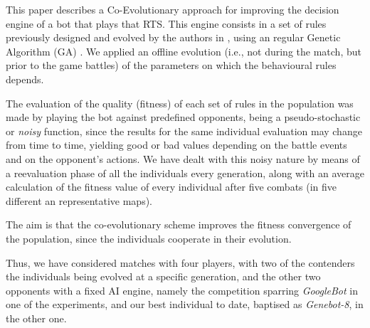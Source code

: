\documentclass{llncs}
\begin{document}
This paper describes a Co-Evolutionary \cite{Coevolution95} approach
for improving %
the decision engine of a bot that plays that RTS. This engine consists
in a set of rules previously designed and evolved by the authors in
\cite{Genebot_CEC11} %
, using an %
regular Genetic Algorithm (GA) \cite{GAs_Goldberg89}. We
applied an offline evolution (i.e., not during the match, but prior to
the game battles) of the parameters on which the behavioural rules
depends. 

The evaluation of the quality (fitness) of each set of rules in the
population was made by playing the bot against predefined opponents, being a pseudo-stochastic or \textit{noisy} function, since the results for the same individual evaluation may change from time to time, yielding good or bad values depending on the battle events and on the opponent's actions. We have dealt with this noisy nature \cite{genebot-evo12} %
by means of a reevaluation phase of all the individuals every generation, along with an average calculation of the fitness value of every individual after five combats (in five different an representative maps). %

The aim is that the co-evolutionary scheme improves the fitness
convergence of the population, since the individuals cooperate in
their evolution. %
                 
 Thus, we have  considered  matches with four players, with two of the
 contenders the individuals being evolved at a specific generation,
 and the other two opponents with a fixed AI engine, namely the
 competition sparring \textit{GoogleBot} in one of the experiments,
 and our best individual to date, baptised as \textit{Genebot-8}, in
 the other one.  
 
\end{document}
